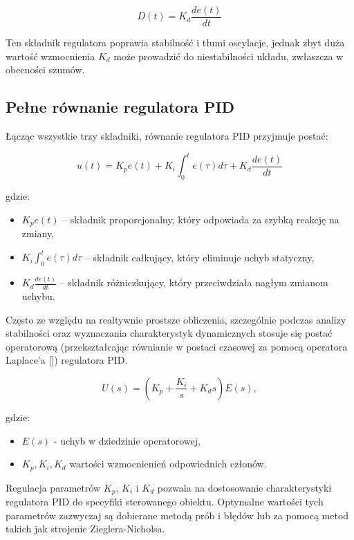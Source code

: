 \begin{equation}
D(t) = K_d \frac{de(t)}{dt}
\end{equation}

Ten składnik regulatora poprawia stabilność i tłumi oscylacje, jednak zbyt duża wartość wzmocnienia $K_d$ może prowadzić do niestabilności układu, zwłaszcza w obecności szumów.

\subsection{Pełne równanie regulatora PID}

Łącząc wszystkie trzy składniki, równanie regulatora PID przyjmuje postać:

\begin{equation}
u(t) = K_p e(t) + K_i \int_{0}^{t} e(\tau) d\tau + K_d \frac{de(t)}{dt}
\end{equation}

gdzie:
\begin{itemize}
    \item $K_p e(t)$ – składnik proporcjonalny, który odpowiada za szybką reakcję na zmiany,
    \item $K_i \int_{0}^{t} e(\tau) d\tau$ – składnik całkujący, który eliminuje uchyb statyczny,
    \item $K_d \frac{de(t)}{dt}$ – składnik różniczkujący, który przeciwdziała nagłym zmianom uchybu.
\end{itemize}

Często ze względu na realtywnie prostsze obliczenia, szczególnie podczas analizy stabilności oraz wyznaczania charakterystyk dynamicznych stosuje się postać operatorową (przekształcając równianie w postaci czasowej za pomocą operatora Laplace’a []) regulatora PID. 

\begin{equation}
    U(s) = (K_p + \frac{K_i}{s} + K_d s) E(s),
\end{equation}

gdzie:
\begin{itemize}
    \item $E(s)$ - uchyb w dziedzinie operatorowej,
    \item $K_p, K_i, K_d$ wartości wzmocnienień odpowiednich członów.
\end{itemize}


Regulacja parametrów $K_p$, $K_i$ i $K_d$ pozwala na dostosowanie charakterystyki regulatora PID do specyfiki sterowanego obiektu. Optymalne wartości tych parametrów zazwyczaj są dobierane metodą prób i błędów lub za pomocą metod takich jak strojenie Zieglera-Nicholsa.

